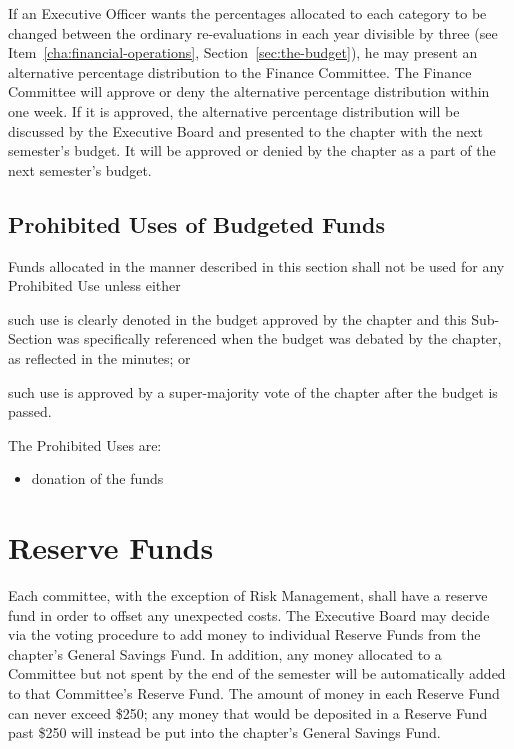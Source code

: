 If an Executive Officer wants the percentages allocated to each category to be
changed between the ordinary re-evaluations in each year divisible by three
(see Item~\ref{cha:financial-operations}, Section~\ref{sec:the-budget}), he may
present an alternative percentage distribution to the Finance Committee.
The Finance Committee will approve or deny the alternative percentage
distribution within one week.
If it is approved, the alternative percentage distribution will be discussed by
the Executive Board and presented to the chapter with the next semester’s
budget.
It will be approved or denied by the chapter as a part of the next semester’s
budget.

\subsection{Prohibited Uses of Budgeted Funds}

Funds allocated in the manner described in this section shall not be used for
any Prohibited Use unless either
\begin{enumerate*}[label={\alph*)}]
    \item such use is clearly denoted in the budget
approved by the chapter and this Sub-Section was specifically referenced when
the budget was debated by the chapter, as reflected in the minutes; or \item such
use is approved by a super-majority vote of the chapter after the budget is
passed.
\end{enumerate*}
The Prohibited Uses are: 
\begin{itemize}
    \item donation of the funds
\end{itemize}

\section{Reserve Funds}

Each committee, with the exception of Risk Management, shall have a reserve
fund in order to offset any unexpected costs.
The Executive Board may decide via the voting procedure to add money to
individual Reserve Funds from the chapter’s General Savings Fund.
In addition, any money allocated to a Committee but not spent by the end of the
semester will be automatically added to that Committee’s Reserve Fund.
The amount of money in each Reserve Fund can never exceed \$250; any money that
would be deposited in a Reserve Fund past \$250 will instead be put into the
chapter’s General Savings Fund.

